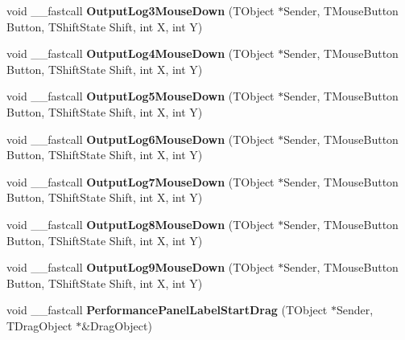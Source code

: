 \begin{DoxyCompactItemize}
void \+\_\+\+\_\+fastcall {\bfseries Output\+Log3\+Mouse\+Down} (T\+Object $\ast$Sender, T\+Mouse\+Button Button, T\+Shift\+State Shift, int X, int Y)
\item 
\mbox{\label{class_t_interface_a0790ed90a42693837b0ade8eb266cf4f}} 
void \+\_\+\+\_\+fastcall {\bfseries Output\+Log4\+Mouse\+Down} (T\+Object $\ast$Sender, T\+Mouse\+Button Button, T\+Shift\+State Shift, int X, int Y)
\item 
\mbox{\label{class_t_interface_acf194f8c713c5097b526f77d38884e7a}} 
void \+\_\+\+\_\+fastcall {\bfseries Output\+Log5\+Mouse\+Down} (T\+Object $\ast$Sender, T\+Mouse\+Button Button, T\+Shift\+State Shift, int X, int Y)
\item 
\mbox{\label{class_t_interface_a762d579b6c0f8eab0cba73e8e39c4c8b}} 
void \+\_\+\+\_\+fastcall {\bfseries Output\+Log6\+Mouse\+Down} (T\+Object $\ast$Sender, T\+Mouse\+Button Button, T\+Shift\+State Shift, int X, int Y)
\item 
\mbox{\label{class_t_interface_ad2b9cecc582203955985af1f015dfd0c}} 
void \+\_\+\+\_\+fastcall {\bfseries Output\+Log7\+Mouse\+Down} (T\+Object $\ast$Sender, T\+Mouse\+Button Button, T\+Shift\+State Shift, int X, int Y)
\item 
\mbox{\label{class_t_interface_a8337441d3bf589ee560e216006b1a455}} 
void \+\_\+\+\_\+fastcall {\bfseries Output\+Log8\+Mouse\+Down} (T\+Object $\ast$Sender, T\+Mouse\+Button Button, T\+Shift\+State Shift, int X, int Y)
\item 
\mbox{\label{class_t_interface_a773e795f4faead1695d929f72537d4a1}} 
void \+\_\+\+\_\+fastcall {\bfseries Output\+Log9\+Mouse\+Down} (T\+Object $\ast$Sender, T\+Mouse\+Button Button, T\+Shift\+State Shift, int X, int Y)
\item 
\mbox{\label{class_t_interface_aa3dc1511a95c0cd529f8b64c1396567e}} 
void \+\_\+\+\_\+fastcall {\bfseries Performance\+Panel\+Label\+Start\+Drag} (T\+Object $\ast$Sender, T\+Drag\+Object $\ast$\&Drag\+Object)
\item 
\mbox{\label{class_t_interface_aaff75059b4aedd0d84190f3570d6ab6b}} 

\end{DoxyCompactItemize}
